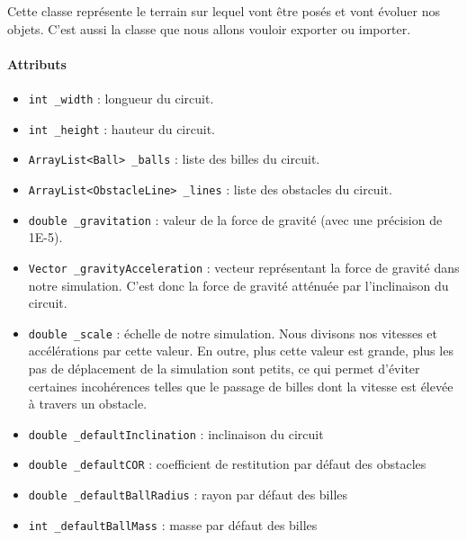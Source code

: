 \documentclass{report}
\begin{document}
Cette classe représente le terrain sur lequel vont être posés et vont évoluer nos objets. C'est aussi la classe que nous allons vouloir exporter ou importer.

\paragraph*{Attributs}
\begin{itemize}
\item \texttt{int \_width} : longueur du circuit.
\item \texttt{int \_height} : hauteur du circuit.
\item \texttt{ArrayList<Ball> \_balls} : liste des billes du circuit.
\item \texttt{ArrayList<ObstacleLine> \_lines} : liste des obstacles du circuit.
\item \texttt{double \_gravitation} : valeur de la force de gravité (avec une précision de 1E-5).
\item \texttt{Vector \_gravityAcceleration} : vecteur représentant la force de gravité dans notre simulation. C'est donc la force de gravité atténuée par l'inclinaison du circuit.
\item \texttt{double \_scale} : échelle de notre simulation. Nous divisons nos vitesses et accélérations par cette valeur. En outre, plus cette valeur est grande, plus les pas de déplacement de la simulation sont petits, ce qui permet d'éviter certaines incohérences telles que le passage de billes dont la vitesse est élevée à travers un obstacle.
\item \texttt{double \_defaultInclination} : inclinaison du circuit
\item \texttt{double \_defaultCOR} : coefficient de restitution par défaut des obstacles
\item \texttt{double \_defaultBallRadius} : rayon par défaut des billes
\item \texttt{int \_defaultBallMass} : masse par défaut des billes
\end{itemize}
\end{document}

